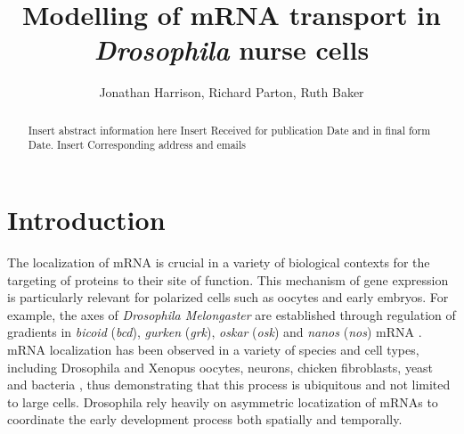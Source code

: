 \documentclass[twocolumn]{biophys}
\begin{document}
\setcounter{page}{1} %

\title{Modelling of mRNA transport in \textit{Drosophila} nurse cells}


\author{Jonathan Harrison, Richard Parton, Ruth Baker}

\address{University of Oxford}





\begin{abstract}%
{Insert abstract information here}%
{Insert Received for publication Date and in final form Date.}%
{Insert Corresponding address and emails}%
\end{abstract}

\maketitle %

\section{Introduction}

The localization of mRNA is crucial in a variety of biological contexts for the targeting of proteins to their site of function.
This mechanism of gene expression is particularly relevant for polarized cells such as oocytes and early embryos.
For example, the axes of \textit{Drosophila Melongaster} are established through regulation of gradients in \textit{bicoid} (\textit{bcd}), \textit{gurken} (\textit{grk}), \textit{oskar} (\textit{osk}) and \textit{nanos} (\textit{nos}) mRNA \citep{wolpert1998}.
mRNA localization has been observed in a variety of species and cell types, including Drosophila and Xenopus oocytes, neurons, chicken fibroblasts, yeast and bacteria \citep{wilkie2001drosophila, bobola1996asymmetric, mowry1992vegetal, rosbash1993rna, nevo2011translation}, thus demonstrating that this process is ubiquitous and not limited to large cells. 
Drosophila rely heavily on asymmetric locatization of mRNAs to coordinate the early development process both spatially and temporally.
\end{document}
